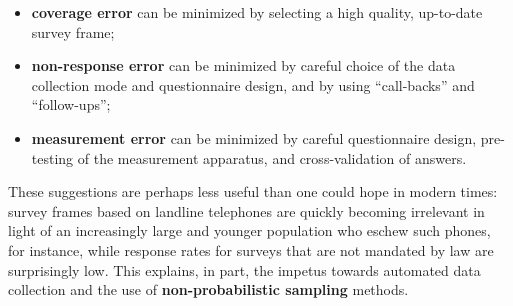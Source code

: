 \begin{itemize}[noitemsep]
\item \textbf{coverage error} can be minimized by selecting a high quality, up-to-date survey frame;
\item \textbf{non-response error} can be minimized by careful choice of the data collection mode and questionnaire design, and by using ``call-backs'' and ``follow-ups'';
\item \textbf{measurement error} can be minimized by careful questionnaire design, pre-testing of the measurement apparatus, and cross-validation of answers.  
\end{itemize}
These suggestions are perhaps less useful than one could hope in modern times: survey frames based on landline telephones are quickly becoming irrelevant in light of an increasingly large and younger population who eschew such phones, for instance, while response rates for surveys that are not mandated by law are  surprisingly low. This explains, in part, the impetus towards automated data collection and the use of \textbf{non-probabilistic sampling} methods.     

